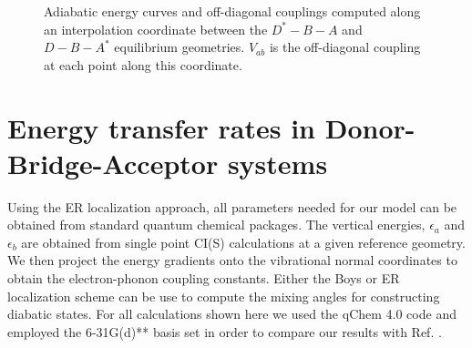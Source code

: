\begin{figure}[t]
\caption{Adiabatic energy curves and off-diagonal couplings computed along an interpolation coordinate between the
$D^{*}-B-A$ and $D-B-A^{*}$ equilibrium geometries.  $V_{ab}$ is the off-diagonal coupling at each point along this coordinate.} \label{parabs}
\end{figure}





\section{Energy transfer rates in  Donor-Bridge-Acceptor systems}


Using the ER localization approach, all parameters needed for our model can be  obtained from
standard  quantum chemical packages.   The vertical energies, $\epsilon_{a}$
and $\epsilon_{b}$ are obtained from single point CI(S) calculations at a given
reference geometry.   We then project the energy gradients onto the vibrational normal
coordinates to obtain the electron-phonon coupling constants.  Either the Boys or ER
localization scheme can be use to compute the mixing
angles for constructing diabatic states. For all calculations shown here we
used the qChem 4.0 code and employed the 6-31G(d){*}{*} basis set
in order to compare our results  with  Ref. \cite{Subotnik:2010}.

